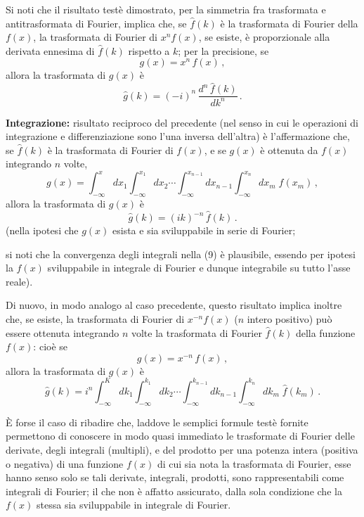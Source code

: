 \documentclass[11pt, a4paper]{book}
\numberwithin{equation}{section}
\begin{document}
Si noti che il risultato testè dimostrato, per la simmetria fra trasformata e antitrasformata di Fourier, implica che, se $\hat{f}(k)$ è la trasformata di Fourier della $f(x)$, la trasformata di Fourier di $x^n f(x)$, se esiste, è proporzionale alla derivata ennesima di $\hat{f}(k)$ rispetto a $k$; per la precisione, se
\begin{equation}
  g(x) = x^n\,f(x)\,, \tag{7}
\end{equation}
allora la trasformata di $g(x)$ è
\begin{equation}
  \hat{g}(k) = (-i)^n\,\frac{d^n\,\hat{f}(k)}{dk^n}\,. \tag{8}
\end{equation}

\textbf{Integrazione:} risultato reciproco del precedente (nel senso in cui le operazioni di integrazione e differenziazione sono l'una inversa dell'altra) è l'affermazione che, se $\hat{f}(k)$ è la trasformata di Fourier di $f(x)$, e se $g(x)$ è ottenuta da $f(x)$ integrando $n$ volte,
\begin{equation}
  g(x) = \int_{-\infty}^{x} dx_1\int_{-\infty}^{x_1} dx_2\cdots
  \int_{-\infty}^{x_{n-1}} dx_{n-1}\int_{-\infty}^{x_n} dx_m\;f(x_m)\,, \tag{9}
\end{equation}
allora la trasformata di $g(x)$ è
\begin{equation}
  \hat{g}(k) = (ik)^{-n}\,\hat{f}(k)\,. \tag{10}
\end{equation}
(nella ipotesi che $g(x)$ esista e sia sviluppabile in serie di Fourier;

si noti che la convergenza degli integrali nella (9) è plausibile, essendo per ipotesi la $f(x)$ sviluppabile in integrale di Fourier e dunque integrabile su tutto l'asse reale).

Di nuovo, in modo analogo al caso precedente, questo risultato implica inoltre che, se esiste, la trasformata di Fourier di $x^{-n}f(x)$ ($n$ intero positivo) può essere ottenuta integrando $n$ volte la trasformata di Fourier $\hat{f}(k)$ della funzione $f(x)$: cioè se
\begin{equation}
  g(x) = x^{-n}\,f(x)\,, \tag{11}
\end{equation}
allora la trasformata di $g(x)$ è
\begin{equation}
  \hat{g}(k) = i^n\int_{-\infty}^{K} dk_1\int_{-\infty}^{k_1} dk_2\cdots
  \int_{-\infty}^{k_{n-1}} dk_{n-1}\int_{-\infty}^{k_n} dk_m\;\hat{f}(k_m)\,. \tag{12}
\end{equation}

È forse il caso di ribadire che, laddove le semplici formule testè fornite permettono di conoscere in modo quasi immediato le trasformate di Fourier delle derivate, degli integrali (multipli), e del prodotto per una potenza intera (positiva o negativa) di una funzione $f(x)$ di cui sia nota la trasformata di Fourier, esse hanno senso solo se tali derivate, integrali, prodotti, sono rappresentabili come integrali di Fourier; il che non è affatto assicurato, dalla sola condizione che la $f(x)$ stessa sia sviluppabile in integrale di Fourier.
\end{document}
